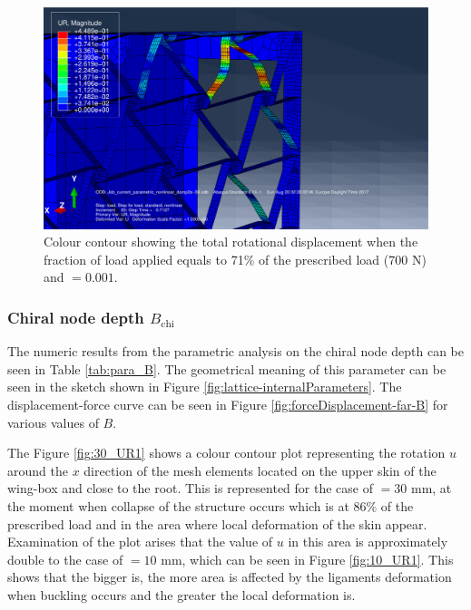       \begin{figure}[!htpb] %
        \centering
        \includegraphics[width=0.7 \textwidth]{figures/result-sim/eccen/0coma001_UR}
        \caption[Colour contour showing the total rotational displacement when the fraction of load applied equals to 71\% of the prescribed load (700 N) and \chie$= 0.001$]{Colour contour showing the total rotational displacement when the fraction of load applied equals to 71\% of the prescribed load (700 N) and \chie$= 0.001$.}
        \label{fig:0coma001_UR}
      \end{figure}

    \clearpage
    \subsubsection{Chiral node depth $B_{\mathrm{chi}}$}

      The numeric results from the parametric analysis on the chiral node depth \chiB can be seen in Table \ref{tab:para_B}. The geometrical meaning of this parameter can be seen in the sketch shown in Figure \ref{fig:lattice-internalParameters}. The displacement-force curve can be seen in Figure \ref{fig:forceDisplacement-far-B} for various values of $B$.

      The Figure \ref{fig:30_UR1} shows a colour contour plot representing the rotation $u$ around the $x$ direction of the mesh elements located on the upper skin of the wing-box and close to the root. This is represented for the case of \chiB $= 30$ mm, at the moment when collapse of the structure occurs which is at $86\%$ of the prescribed load and in the area where local deformation of the skin appear. Examination of the plot arises that the value of $u$ in this area is approximately double to the case of \chiB$= 10$ mm, which can be seen in Figure \ref{fig:10_UR1}. This shows that the bigger \chiB is, the more area is affected by the ligaments deformation when buckling occurs and the greater the local deformation is.

